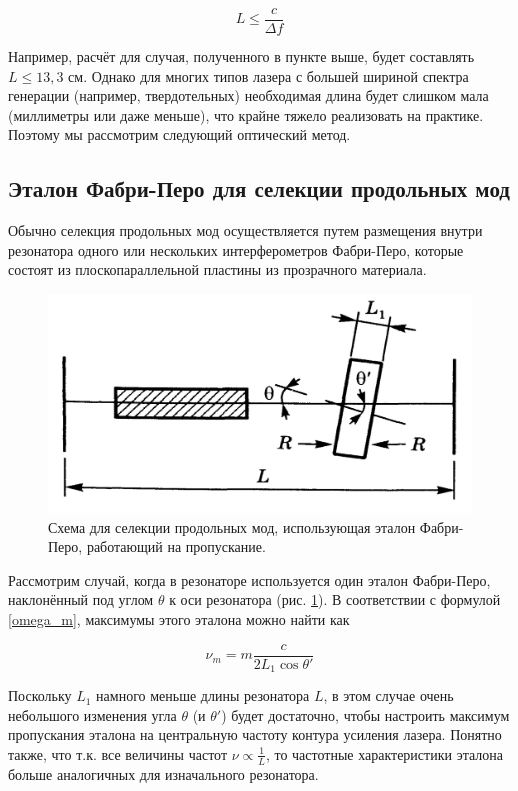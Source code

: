 \documentclass[12pt]{kiarticle}
\begin{document}
\begin{equation}\label{L < c/df}
L \leq \dfrac{c}{\Delta f}
\end{equation}

Например, расчёт для случая, полученного в пункте выше, будет составлять $ L \leq 13,3 $ см. Однако для многих типов лазера с большей шириной спектра генерации (например, твердотельных) необходимая длина будет слишком мала (миллиметры или даже меньше), что крайне тяжело реализовать на практике. Поэтому мы рассмотрим следующий оптический метод.

\subsection{Эталон Фабри-Перо для селекции продольных мод}

Обычно селекция продольных мод осуществляется путем размещения внутри резонатора одного или нескольких интерферометров Фабри-Перо, которые состоят из плоскопараллельной пластины из прозрачного материала. 

\begin{figure} 
	\includegraphics[width=\linewidth]{FP_selection}
	\caption{Схема для селекции продольных мод, использующая эталон 	Фабри-Перо, работающий на пропускание.}
	\label{FP_selection}
\end{figure}

Рассмотрим случай, когда в резонаторе используется один эталон Фабри-Перо, наклонённый под углом $ \theta $ к оси резонатора (рис. \ref{FP_selection}). В соответствии с формулой \eqref{omega_m}, максимумы этого эталона можно найти как 

\begin{equation}\label{}
\nu_m = m \dfrac{c}{2L_1 \cos \theta'}
\end{equation}

Поскольку $ L_1 $ намного меньше длины резонатора $ L $, в этом случае очень небольшого изменения угла $ \theta $ (и $ \theta' $) будет достаточно, чтобы настроить максимум пропускания эталона на центральную частоту контура усиления лазера. Понятно также, что т.к. все величины частот $ \nu \propto \frac{1}{L} $, то частотные характеристики эталона больше аналогичных для изначального резонатора. 
\end{document}
